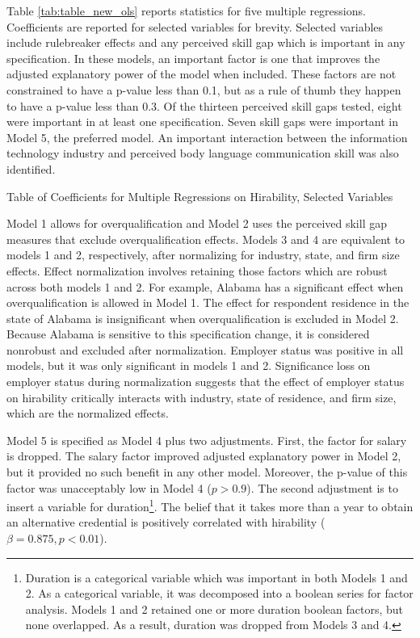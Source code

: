 \documentclass[review]{elsarticle}
\begin{document}
Table \ref{tab:table_new_ols} reports statistics for five multiple regressions.
Coefficients are reported for selected variables for brevity.
Selected variables include rulebreaker effects and any perceived skill gap which is important in any specification.
In these models, an important factor is one that improves the adjusted explanatory power of the model when included.
These factors are not constrained to have a p-value less than 0.1, but as a rule of thumb they happen to have a p-value less than 0.3.
Of the thirteen perceived skill gaps tested, eight were important in at least one specification.
Seven skill gaps were important in Model 5, the preferred model.
An important interaction between the information technology industry and perceived body language communication skill was also identified.

\begin{table}
    \caption{Table of Coefficients for Multiple Regressions on Hirability, Selected Variables}
    \resizebox{\columnwidth}{!}{
        
    }
    \label{tab:table_new_ols}
\end{table}

Model 1 allows for overqualification and Model 2 uses the perceived skill gap measures that exclude overqualification effects.
Models 3 and 4 are equivalent to models 1 and 2, respectively, after normalizing for industry, state, and firm size effects.
Effect normalization involves retaining those factors which are robust across both models 1 and 2.
For example, Alabama has a significant effect when overqualification is allowed in Model 1.
The effect for respondent residence in the state of Alabama is insignificant when overqualification is excluded in Model 2.
Because Alabama is sensitive to this specification change, it is considered nonrobust and excluded after normalization.
Employer status was positive in all models, but it was only significant in models 1 and 2.
Significance loss on employer status during normalization
suggests that the effect of employer status on hirability critically interacts with industry,
state of residence, and firm size, which are the normalized effects.

Model 5 is specified as Model 4 plus two adjustments.
First, the factor for salary is dropped.
The salary factor improved adjusted explanatory power in Model 2, but it provided no such benefit in any other model.
Moreover, the p-value of this factor was unacceptably low in Model 4 ($p > 0.9$).
The second adjustment is to insert a variable for duration\footnote{
    Duration is a categorical variable which was important in both Models 1 and 2.
    As a categorical variable, it was decomposed into a boolean series for factor analysis.
    Models 1 and 2 retained one or more duration boolean factors, but none overlapped.
    As a result, duration was dropped from Models 3 and 4.
}.
The belief that it takes more than a year to obtain an alternative credential
is positively correlated with hirability ($\beta = 0.875, p < 0.01$).
\end{document}
